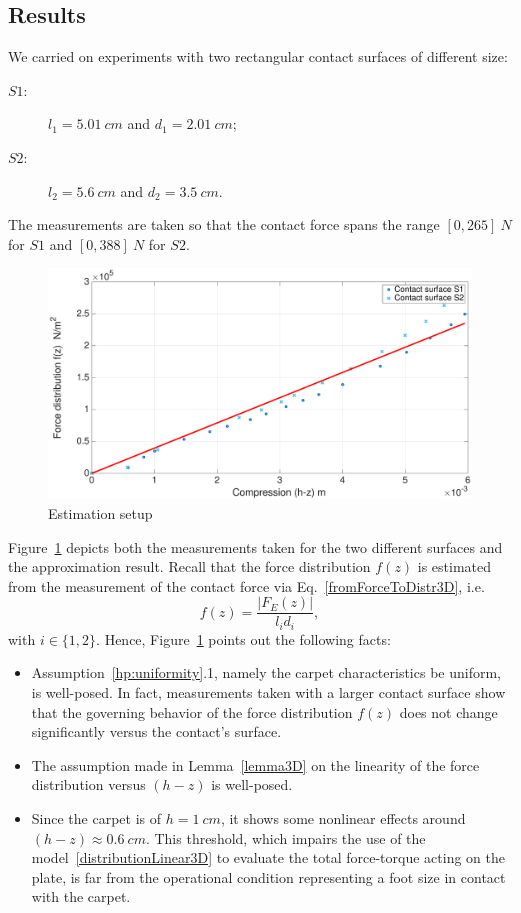 \documentclass{article}
\begin{document}
\subsection{Results}
We carried on experiments with two rectangular contact surfaces of different size:
\begin{description}
  \item[$S1:$] $l_1 = 5.01 \ cm$ and $d_1 = 2.01 \ cm$;
  \item[$S2:$] $l_2 = 5.6 \ cm$ and $d_2 = 3.5 \ cm$.
\end{description}
The measurements are taken so that the contact force spans the range $[0,265] \ N$ for $S1$ and $[0,388] \ N$ for $S2$.
\begin{figure}[t]
    \begin{center}
\includegraphics[width=\linewidth]{figures/estimationTests.eps}    \caption{Estimation setup}
    \label{fig:estimationResults}
    \end{center}
\end{figure}
Figure~\ref{fig:estimationResults} depicts both the measurements taken  for the two different surfaces and the approximation result. Recall that the force distribution $f(z)$ is estimated from the measurement of the contact force via  
Eq.~\eqref{fromForceToDistr3D}, i.e. 
\begin{equation}
f(z) = \frac{|F_E(z)|}{l_id_i}, \nonumber
\end{equation}
with $i \in \{1,2\}$. Hence, Figure~\ref{fig:estimationResults} points out the following facts:
\begin{itemize}
\item Assumption~\ref{hp:uniformity}.1, namely the carpet characteristics be uniform,  is well-posed. In fact, measurements taken with a larger contact surface show that the governing behavior of the force distribution $f(z)$ does not change significantly versus the contact's surface.  
\item The assumption made in Lemma~\ref{lemma3D} on the linearity of the force distribution  versus $(h-z)$ is well-posed. 
\item Since the carpet is of $h= 1 \ cm$, it shows some nonlinear effects around $(h-z)\approx 0.6 \ cm$. This threshold, which impairs the use of the model~\eqref{distributionLinear3D} to evaluate the total force-torque acting on the plate, is far from the operational condition representing a foot size in contact with the carpet.   
\end{itemize}
\end{document}
